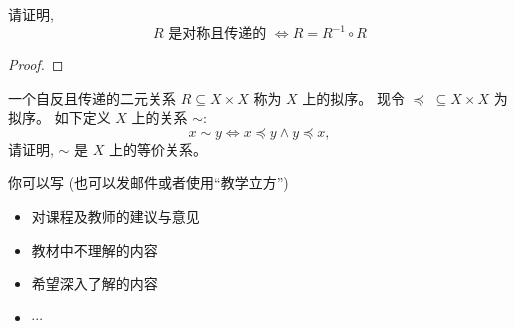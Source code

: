 \documentclass[a4paper, justified]{tufte-handout}
\begin{document}
\begin{problem}
  请证明,
  \[
    R \text{ 是对称且传递的 } \iff R = R^{-1} \circ R
  \]
\end{problem}

\begin{proof}
\end{proof}

\begin{problem}
  一个自反且传递的二元关系 $R \subseteq X \times X$
  称为 $X$ 上的拟序。
  现令 $\preceq\; \subseteq X \times X$ 为拟序。
  如下定义 $X$ 上的关系 $\sim$:
  \[
    x \sim y \iff x \preceq y \land y \preceq x,
  \]
  请证明, $\sim$ 是 $X$ 上的等价关系。
\end{problem}

\begin{solution}
\end{solution}

\begincorrection

\beginfb

你可以写 (也可以发邮件或者使用``教学立方'')
\begin{itemize}
  \item 对课程及教师的建议与意见
  \item 教材中不理解的内容
  \item 希望深入了解的内容
  \item $\cdots$
\end{itemize}
\end{document}
